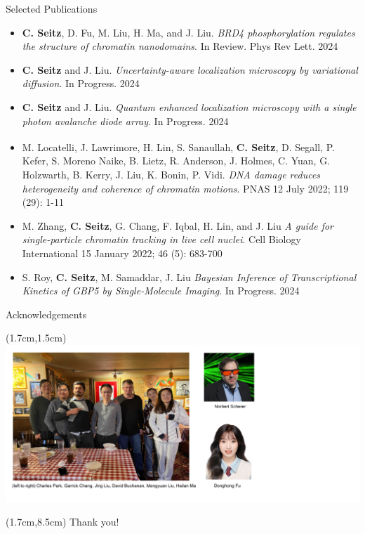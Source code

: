 \documentclass{beamer}					%
\begin{document}
\begin{frame}{Selected Publications}

\begin{itemize}

\item \textbf{C. Seitz}, D. Fu, M. Liu, H. Ma, and J. Liu. \textit{BRD4 phosphorylation regulates the structure of chromatin nanodomains}. In Review. Phys Rev Lett. 2024

\item \textbf{C. Seitz} and J. Liu. \textit{Uncertainty-aware localization microscopy by variational diffusion}. In Progress. 2024

\item \textbf{C. Seitz} and J. Liu. \textit{Quantum enhanced localization microscopy with a single photon avalanche diode array}. In Progress. 2024

\item M. Locatelli\textsuperscript{\textdagger}, J. Lawrimore\textsuperscript{\textdagger}, H. Lin\textsuperscript{\textdagger}, S. Sanaullah, \textbf{C. Seitz}, D. Segall, P. Kefer, S. Moreno Naike, B. Lietz, R. Anderson, J. Holmes, C. Yuan, G. Holzwarth, B. Kerry, J. Liu, K. Bonin, P. Vidi. \textit{DNA damage reduces heterogeneity and coherence of chromatin motions}. PNAS 12 July 2022; 119 (29): 1-11

\item M. Zhang, \textbf{C. Seitz}, G. Chang, F. Iqbal, H. Lin, and J. Liu \textit{A guide for single-particle chromatin tracking in live cell nuclei}. Cell Biology International 15 January 2022; 46 (5): 683-700

\item S. Roy, \textbf{C. Seitz}, M. Samaddar, J. Liu \textit{Bayesian Inference of Transcriptional Kinetics of GBP5 by Single-Molecule Imaging}. In Progress. 2024

\end{itemize}
\end{frame}



\begin{frame}{Acknowledgements}
\begin{textblock*}{16cm}(1.7cm,1.5cm)
\includegraphics[width=16cm]{../../dissertation/dissertation/media/Lab.png}
\end{textblock*}

\begin{textblock*}{14cm}(1.7cm,8.5cm)
Thank you!
\end{textblock*}

\end{frame}
\end{document}
